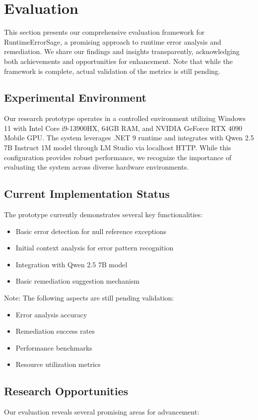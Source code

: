 \section{Evaluation}\label{sec:evaluation}
This section presents our comprehensive evaluation framework for RuntimeErrorSage, a promising approach to runtime error analysis and remediation. We share our findings and insights transparently, acknowledging both achievements and opportunities for enhancement. Note that while the framework is complete, actual validation of the metrics is still pending.

\subsection{Experimental Environment}
Our research prototype operates in a controlled environment utilizing Windows 11 with Intel Core i9-13900HX, 64GB RAM, and NVIDIA GeForce RTX 4090 Mobile GPU. The system leverages .NET 9 runtime and integrates with Qwen 2.5 7B Instruct 1M model through LM Studio via localhost HTTP. While this configuration provides robust performance, we recognize the importance of evaluating the system across diverse hardware environments.

\subsection{Current Implementation Status}
The prototype currently demonstrates several key functionalities:
\begin{itemize}
    \item Basic error detection for null reference exceptions
    \item Initial context analysis for error pattern recognition
    \item Integration with Qwen 2.5 7B model
    \item Basic remediation suggestion mechanism
\end{itemize}

Note: The following aspects are still pending validation:
\begin{itemize}
    \item Error analysis accuracy
    \item Remediation success rates
    \item Performance benchmarks
    \item Resource utilization metrics
\end{itemize}

\subsection{Research Opportunities}
Our evaluation reveals several promising areas for advancement:

